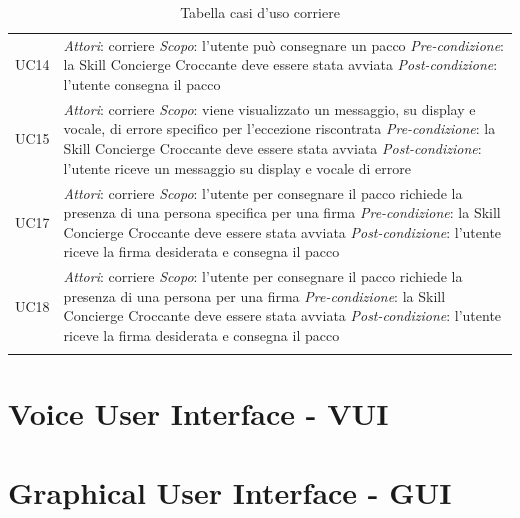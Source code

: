 \begin{center}
\begin{longtable}{  p{2.5cm} p{9.8cm} }
		UC14 &  \textit{Attori}: corriere \newline \textit{Scopo}: l'utente può consegnare un pacco \newline \textit{Pre-condizione}: la Skill Concierge Croccante deve essere stata avviata \newline \textit{Post-condizione}: l'utente consegna il pacco \\
		
		UC15 &  \textit{Attori}: corriere \newline \textit{Scopo}: viene visualizzato un messaggio, su display e vocale, di errore specifico per l'eccezione riscontrata \newline \textit{Pre-condizione}: la Skill Concierge Croccante deve essere stata avviata \newline \textit{Post-condizione}: l'utente riceve un messaggio su display e vocale di errore\\
		
		UC17 &  \textit{Attori}: corriere \newline \textit{Scopo}: l'utente per consegnare il pacco richiede la presenza di una persona specifica per una firma \newline \textit{Pre-condizione}: la Skill Concierge Croccante deve essere stata avviata \newline \textit{Post-condizione}: l'utente riceve la firma desiderata e consegna il pacco\\
		
		UC18 &  \textit{Attori}: corriere \newline \textit{Scopo}: l'utente per consegnare il pacco richiede la presenza di una persona per una firma \newline \textit{Pre-condizione}: la Skill Concierge Croccante deve essere stata avviata \newline \textit{Post-condizione}: l'utente riceve la firma desiderata e consegna il pacco\\
		\rowcolor{white}
		\caption{Tabella casi d'uso corriere}
	\end{longtable}
\end{center}
\section{Voice User Interface - VUI}
\section{Graphical User Interface - GUI}
